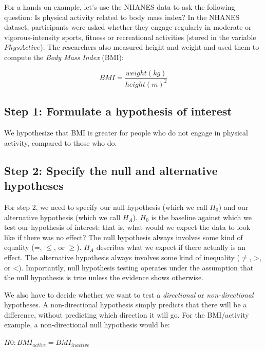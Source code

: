\documentclass[
  12pt,
]{book}
\begin{document}
For a hands-on example, let's use the NHANES data to ask the following question: Is physical activity related to body mass index? In the NHANES dataset, participants were asked whether they engage regularly in moderate or vigorous-intensity sports, fitness or recreational activities (stored in the variable \(PhysActive\)). The researchers also measured height and weight and used them to compute the \emph{Body Mass Index} (BMI):

\[
BMI = \frac{weight(kg)}{height(m)^2}
\]

\hypertarget{step-1-formulate-a-hypothesis-of-interest}{%
\subsection{Step 1: Formulate a hypothesis of interest}\label{step-1-formulate-a-hypothesis-of-interest}}

We hypothesize that BMI is greater for people who do not engage in physical activity, compared to those who do.

\hypertarget{step-2-specify-the-null-and-alternative-hypotheses}{%
\subsection{Step 2: Specify the null and alternative hypotheses}\label{step-2-specify-the-null-and-alternative-hypotheses}}

For step 2, we need to specify our null hypothesis (which we call \(H_0\)) and our alternative hypothesis (which we call \(H_A\)). \(H_0\) is the baseline against which we test our hypothesis of interest: that is, what would we expect the data to look like if there was no effect? The null hypothesis always involves some kind of equality (=, \(\le\), or \(\ge\)). \(H_A\) describes what we expect if there actually is an effect. The alternative hypothesis always involves some kind of inequality (\(\ne\), \textgreater, or \textless). Importantly, null hypothesis testing operates under the assumption that the null hypothesis is true unless the evidence shows otherwise.

We also have to decide whether we want to test a \emph{directional} or \emph{non-directional} hypotheses. A non-directional hypothesis simply predicts that there will be a difference, without predicting which direction it will go. For the BMI/activity example, a non-directional null hypothesis would be:

\(H0: BMI_{active} = BMI_{inactive}\)
\end{document}
